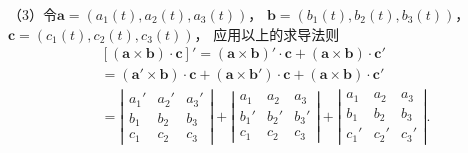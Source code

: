 （3）令$\bm{a}=(a_1(t), a_2(t), a_3(t))$，
	$\bm{b}=(b_1(t), b_2(t), b_3(t))$，$\bm{c}=(c_1(t), c_2(t), c_3(t))$，
	应用以上的求导法则
	\begin{align*}
		&[(\bm{a}\times\bm{b})\cdot\bm{c}]'
		=(\bm{a}\times\bm{b})'\cdot\bm{c}+(\bm{a}\times\bm{b})\cdot\bm{c}'\\
		&=(\bm{a}'\times\bm{b})\cdot\bm{c}+(\bm{a}\times\bm{b}')\cdot\bm{c}
		+(\bm{a}\times\bm{b})\cdot\bm{c}'\\
		&=\left|\begin{array}{ccc}
  	a_1' & a_2' & a_3'\\
  	b_1 & b_2 & b_3\\
  	c_1 & c_2 & c_3
  \end{array}\right|
  +\left|\begin{array}{ccc}
  	a_1 & a_2 & a_3\\
  	b_1' & b_2' & b_3'\\
  	c_1 & c_2 & c_3
  \end{array}\right|
  +\left|\begin{array}{ccc}
  	a_1 & a_2 & a_3\\
  	b_1 & b_2 & b_3\\
  	c_1' & c_2' & c_3'
  \end{array}\right|.
	\end{align*}
	\fin

